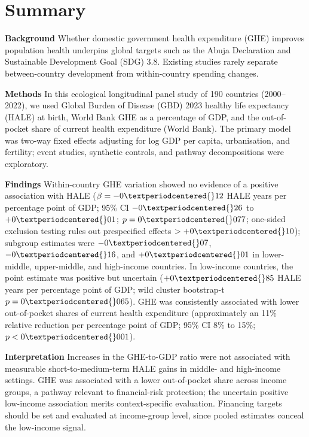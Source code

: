 \documentclass[12pt,a4paper]{article}
\begin{document}
\section*{Summary}

\noindent\textbf{Background}\quad
Whether domestic government health expenditure (GHE) improves population
health underpins global targets such as the Abuja Declaration and Sustainable Development Goal (SDG) 3.8.
Existing studies rarely separate between-country development from
within-country spending changes.

\noindent\textbf{Methods}\quad
In this ecological longitudinal panel study of 190 countries (2000--2022),
we used Global Burden of Disease (GBD) 2023 healthy life expectancy (HALE) at birth,
World Bank GHE as a percentage of GDP, and the out-of-pocket share of
current health expenditure (World Bank). The primary model was two-way fixed
effects adjusting for log GDP per capita, urbanisation, and fertility;
event studies, synthetic controls, and pathway decompositions were
exploratory.

\noindent\textbf{Findings}\quad
Within-country
GHE variation showed no evidence of a positive association with HALE ($\beta = -0{\textperiodcentered{}}12$ HALE years per percentage point of GDP;
95\% CI $-0{\textperiodcentered{}}26$ to $+0{\textperiodcentered{}}01$; $p = 0{\textperiodcentered{}}077$; one-sided
exclusion testing rules out prespecified effects $>+0{\textperiodcentered{}}10$);
subgroup estimates were $-0{\textperiodcentered{}}07$,
$-0{\textperiodcentered{}}16$, and $+0{\textperiodcentered{}}01$ in lower-middle, upper-middle, and
high-income countries. In low-income countries, the point estimate was
positive but uncertain ($+0{\textperiodcentered{}}85$ HALE years per percentage point of GDP;
wild cluster bootstrap-t $p = 0{\textperiodcentered{}}065$). GHE was consistently
associated with lower out-of-pocket shares of current health expenditure
(approximately an 11\% relative reduction per percentage point of GDP;
95\% CI 8\% to 15\%; $p < 0{\textperiodcentered{}}001$).

\noindent\textbf{Interpretation}\quad
Increases in the GHE-to-GDP ratio were not
associated with measurable short-to-medium-term HALE gains in middle- and
high-income settings. GHE was associated with a
lower out-of-pocket share across income groups, a pathway relevant to
financial-risk protection; the uncertain positive
low-income association merits context-specific evaluation. Financing targets should be set and evaluated at income-group level, since pooled estimates conceal the low-income signal.
\end{document}
